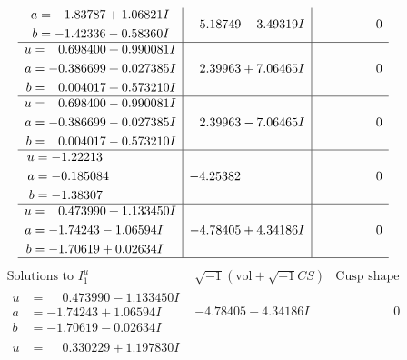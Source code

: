 \documentclass[1p]{elsarticle_modified}
\theoremstyle{definition}
\newcommand{\I}{\sqrt{-1}}
\begin{document}
$$\begin{array}{c|c|c}
\begin{aligned}
a &= -1.83787 + 1.06821 I \\
b &= -1.42336 - 0.58360 I\end{aligned}
 & -5.18749 - 3.49319 I & \phantom{-0.000000 } 0 \\ \hline\begin{aligned}
u &= \phantom{-}0.698400 + 0.990081 I \\
a &= -0.386699 + 0.027385 I \\
b &= \phantom{-}0.004017 + 0.573210 I\end{aligned}
 & \phantom{-}2.39963 + 7.06465 I & \phantom{-0.000000 } 0 \\ \hline\begin{aligned}
u &= \phantom{-}0.698400 - 0.990081 I \\
a &= -0.386699 - 0.027385 I \\
b &= \phantom{-}0.004017 - 0.573210 I\end{aligned}
 & \phantom{-}2.39963 - 7.06465 I & \phantom{-0.000000 } 0 \\ \hline\begin{aligned}
u &= -1.22213\phantom{ +0.000000I} \\
a &= -0.185084\phantom{ +0.000000I} \\
b &= -1.38307\phantom{ +0.000000I}\end{aligned}
 & -4.25382\phantom{ +0.000000I} & \phantom{-0.000000 } 0 \\ \hline\begin{aligned}
u &= \phantom{-}0.473990 + 1.133450 I \\
a &= -1.74243 - 1.06594 I \\
b &= -1.70619 + 0.02634 I\end{aligned}
 & -4.78405 + 4.34186 I & \phantom{-0.000000 } 0\\
 \hline 
 \end{array}$$\newpage$$\begin{array}{c|c|c}  
\text{Solutions to }I^u_{1}& \I (\text{vol} + \sqrt{-1}CS) & \text{Cusp shape}\\
 \hline 
\begin{aligned}
u &= \phantom{-}0.473990 - 1.133450 I \\
a &= -1.74243 + 1.06594 I \\
b &= -1.70619 - 0.02634 I\end{aligned}
 & -4.78405 - 4.34186 I & \phantom{-0.000000 } 0 \\ \hline\begin{aligned}
u &= \phantom{-}0.330229 + 1.197830 I \\

\end{aligned}
\end{array}$$
\end{document}
